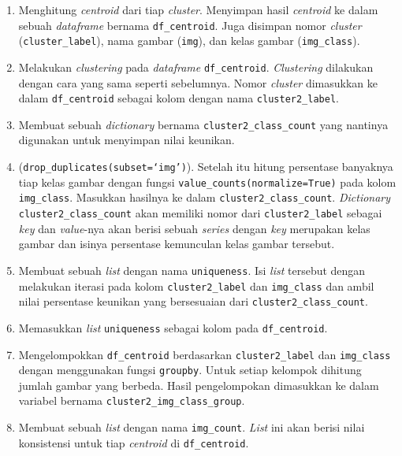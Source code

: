 \begin{enumerate}
	\item Menghitung \textit{centroid} dari tiap \textit{cluster}. Menyimpan hasil \textit{centroid} ke dalam sebuah \textit{dataframe} bernama \texttt{df\_centroid}. Juga disimpan nomor \textit{cluster} (\texttt{cluster\_label}), nama gambar (\texttt{img}), dan kelas gambar (\texttt{img\_class}).
	\item Melakukan \textit{clustering} pada \textit{dataframe} \texttt{df\_centroid}. \textit{Clustering} dilakukan dengan cara yang sama seperti sebelumnya. Nomor \textit{cluster} dimasukkan ke dalam \texttt{df\_centroid} sebagai kolom dengan nama \texttt{cluster2\_label}.
	\item Membuat sebuah \textit{dictionary} bernama \texttt{cluster2\_class\_count} yang nantinya digunakan untuk menyimpan nilai keunikan.
	\item {} \newline {} \newline (\texttt{drop\_duplicates(subset=`img')}). Setelah itu hitung persentase banyaknya tiap kelas gambar dengan fungsi \texttt{value\_counts(normalize=True)} pada kolom \texttt{img\_class}. Masukkan hasilnya ke dalam \texttt{cluster2\_class\_count}. \textit{Dictionary} \texttt{cluster2\_class\_count} akan memiliki nomor dari \texttt{cluster2\_label} sebagai \textit{key} dan \textit{value}-nya akan berisi sebuah \textit{series} dengan \textit{key} merupakan kelas gambar dan isinya persentase kemunculan kelas gambar tersebut.
	\item Membuat sebuah \textit{list} dengan nama \texttt{uniqueness}. Isi \textit{list} tersebut dengan melakukan iterasi pada kolom \texttt{cluster2\_label} dan \texttt{img\_class} dan ambil nilai persentase keunikan yang bersesuaian dari \texttt{cluster2\_class\_count}.
	\item Memasukkan \textit{list} \texttt{uniqueness} sebagai kolom pada \texttt{df\_centroid}.
	\item Mengelompokkan \texttt{df\_centroid} berdasarkan \texttt{cluster2\_label} dan \texttt{img\_class} dengan menggunakan fungsi \texttt{groupby}. Untuk setiap kelompok dihitung jumlah gambar yang berbeda. Hasil pengelompokan dimasukkan ke dalam variabel bernama \texttt{cluster2\_img\_class\_group}.
	\item Membuat sebuah \textit{list} dengan nama \texttt{img\_count}. \textit{List} ini akan berisi nilai konsistensi untuk tiap \textit{centroid} di \texttt{df\_centroid}.

\end{enumerate}
